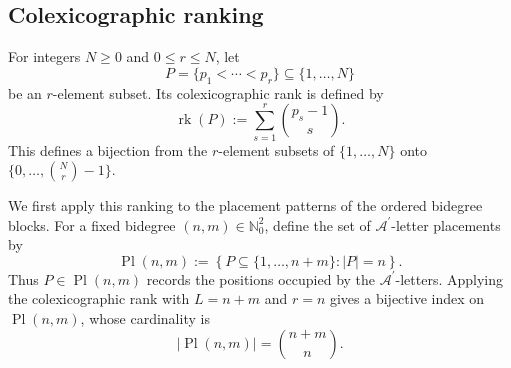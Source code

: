 \documentclass{amsart}
\theoremstyle{definition}
\theoremstyle{remark}
\begin{document}
\subsection{Colexicographic ranking}
\label{sec:colexicographic_ranking}

For integers $N\geq0$ and $0\leq r\leq N$, let
\[
    P=\{p_1<\cdots<p_r\}
    \subseteq
    \{1,\ldots,N\}
\]
be an $r$-element subset. Its colexicographic rank is defined by
\cite[Theorem~L and Eq.~(20), p.~360]{knuth2011taocp4a}
\[
    \operatorname{rk}(P)
    :=
    \sum_{s=1}^{r}
    \binom{p_s-1}{s}.
\]
This defines a bijection from the $r$-element subsets of
$\{1,\ldots,N\}$ onto
$\{0,\ldots,\binom{N}{r}-1\}$.

We first apply this ranking to the placement patterns of the ordered
bidegree blocks. For a fixed bidegree
$(n,m)\in\mathbb{N}_0^2$, define the set of
$\mathcal{A}^{\prime}$-letter placements by
\[
    \operatorname{Pl}(n,m)
    :=
    \left\{
        P\subseteq\{1,\ldots,n+m\}
        :
        |P|=n
    \right\}.
\]
Thus $P\in\operatorname{Pl}(n,m)$ records the positions occupied by the
$\mathcal{A}^{\prime}$-letters. Applying the colexicographic rank with
$L=n+m$ and $r=n$ gives a bijective index on
$\operatorname{Pl}(n,m)$, whose cardinality is
\[
    |\operatorname{Pl}(n,m)|
    =
    \binom{n+m}{n}.
\]
\end{document}
